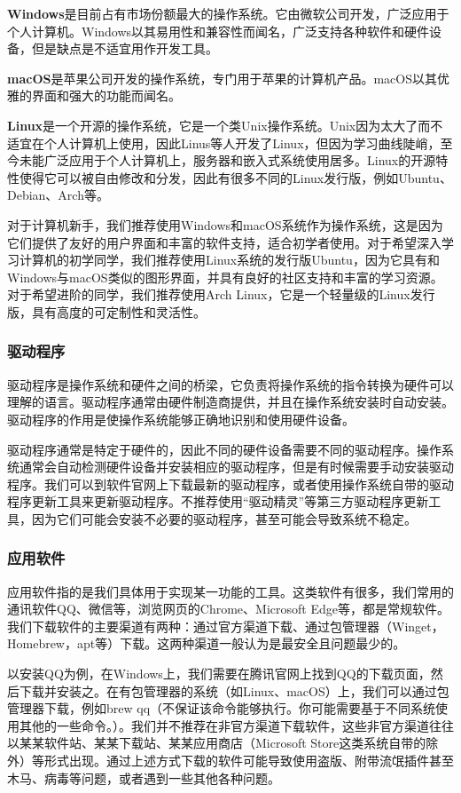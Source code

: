 \documentclass[../main.tex]{subfiles}
\begin{document}
\textbf{Windows}是目前占有市场份额最大的操作系统。它由微软公司开发，广泛应用于个人计算机。Windows以其易用性和兼容性而闻名，广泛支持各种软件和硬件设备，但是缺点是不适宜用作开发工具。

\textbf{macOS}是苹果公司开发的操作系统，专门用于苹果的计算机产品。macOS以其优雅的界面和强大的功能而闻名。

\textbf{Linux}是一个开源的操作系统，它是一个类Unix操作系统。Unix因为太大了而不适宜在个人计算机上使用，因此Linus等人开发了Linux，但因为学习曲线陡峭，至今未能广泛应用于个人计算机上，服务器和嵌入式系统使用居多。Linux的开源特性使得它可以被自由修改和分发，因此有很多不同的Linux发行版，例如Ubuntu、Debian、Arch等。

对于计算机新手，我们推荐使用Windows和macOS系统作为操作系统，这是因为它们提供了友好的用户界面和丰富的软件支持，适合初学者使用。对于希望深入学习计算机的初学同学，我们推荐使用Linux系统的发行版Ubuntu，因为它具有和Windows与macOS类似的图形界面，并具有良好的社区支持和丰富的学习资源。对于希望进阶的同学，我们推荐使用Arch Linux，它是一个轻量级的Linux发行版，具有高度的可定制性和灵活性。

\subsubsection{驱动程序}

驱动程序是操作系统和硬件之间的桥梁，它负责将操作系统的指令转换为硬件可以理解的语言。驱动程序通常由硬件制造商提供，并且在操作系统安装时自动安装。驱动程序的作用是使操作系统能够正确地识别和使用硬件设备。

驱动程序通常是特定于硬件的，因此不同的硬件设备需要不同的驱动程序。操作系统通常会自动检测硬件设备并安装相应的驱动程序，但是有时候需要手动安装驱动程序。我们可以到软件官网上下载最新的驱动程序，或者使用操作系统自带的驱动程序更新工具来更新驱动程序。不推荐使用“驱动精灵”等第三方驱动程序更新工具，因为它们可能会安装不必要的驱动程序，甚至可能会导致系统不稳定。

\subsubsection{应用软件}

应用软件指的是我们具体用于实现某一功能的工具。这类软件有很多，我们常用的通讯软件QQ、微信等，浏览网页的Chrome、Microsoft Edge等，都是常规软件。
我们下载软件的主要渠道有两种：通过官方渠道下载、通过包管理器（Winget，Homebrew，apt等）下载。这两种渠道一般认为是最安全且问题最少的。

以安装QQ为例，在Windows上，我们需要在腾讯官网上找到QQ的下载页面，然后下载并安装之。在有包管理器的系统（如Linux、macOS）上，我们可以通过包管理器下载，例如brew qq（不保证该命令能够执行。你可能需要基于不同系统使用其他的一些命令。）。我们并不推荐在非官方渠道下载软件，这些非官方渠道往往以某某软件站、某某下载站、某某应用商店（Microsoft Store这类系统自带的除外）等形式出现。通过上述方式下载的软件可能导致使用盗版、附带流氓插件甚至木马、病毒等问题，或者遇到一些其他各种问题。
\end{document}
